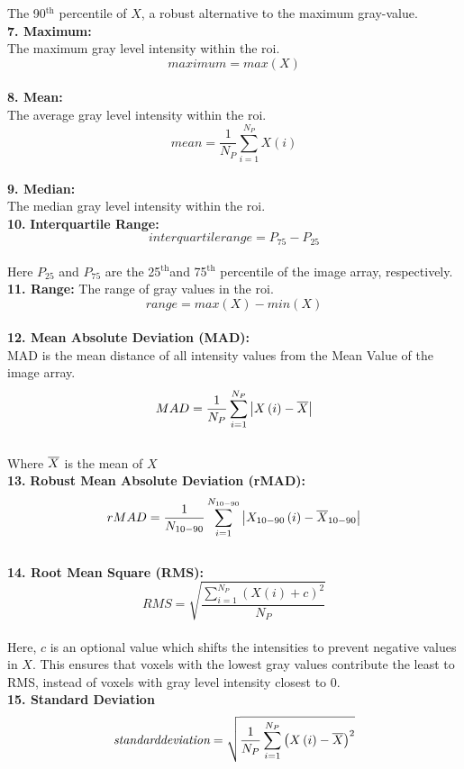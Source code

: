 The 90$^{\mathrm{th}}$ percentile of $X$, a robust alternative to the maximum gray-value. \\
\textbf{7. Maximum:}\\
The maximum gray level intensity within the \ac{roi}.\\
\[\textit{maximum}=max \left(X\right)\]\\
\textbf{8. Mean:}\\
The average gray level intensity within the \ac{roi}.\newline
\[mean=\frac{1}{N_{P}}\sum _{i=1}^{N_{P}}X\left(i\right)\]\\
\textbf{9. Median:}\\
The median gray level intensity within the \ac{roi}.\\
\textbf{10.} \textbf{Interquartile Range:}\\
\[\textit{interquartilerange}=P_{75}-P_{25}\]\\
Here $P_{25}$ and $P_{75}$ {are the 25}$^{\mathrm{th}}${and 75}$^{\mathrm{th}}$ {percentile of the image array, respectively.}
\textbf{11. Range:}\newline
The range of gray values in the \ac{roi}.\\
\[\textit{range}=max\left(X\right)-min \left(X\right)\]\\
\textbf{12. Mean Absolute Deviation (MAD):}\\
MAD is the mean distance of all intensity values from the Mean Value of the image array.\\
\[MAD=\frac{1}{N_{P}}\sum _{i=1}^{N_{P}}\left| X\left(i\right)-\overline{X}\right|\] \\
{Where } $\overline{X}$ {is the mean of} $X$\\
\textbf{13.} \textbf{Robust Mean Absolute Deviation (rMAD):}\\
\[rMAD=\frac{1}{N_{10-90}}\sum _{i=1}^{N_{10-90}}\left| X_{10-90}\left(i\right)-\overline{X}_{10-90}\right|\] \\
\textbf{14. Root Mean Square (RMS):}\\
\[RMS=\sqrt{\frac{\sum _{i=1}^{N_{P}}\left(X\left(i\right)+c\right)^{2}}{N_{P}}}\]\\
Here, $c$ is an optional value which shifts the intensities to prevent negative values in $X$. This ensures that voxels with the lowest gray values contribute the least to RMS, instead of voxels with gray level intensity closest to 0.\\
\textbf{15. Standard Deviation}\\
\[\textit{standarddeviation}=\sqrt{\frac{1}{N_{P}}\sum _{i=1}^{N_{P}}\left(X\left(i\right)-\overline{X}\right)^{2}}\]\\
